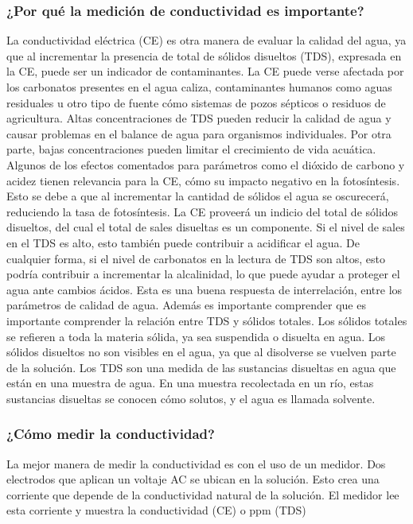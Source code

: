 \subsubsection{¿Por qu\'e la medici\'on de conductividad es importante?}
La conductividad eléctrica (CE) es otra manera de evaluar la calidad del agua, ya que al incrementar la presencia de total de sólidos disueltos (TDS), expresada en la CE, puede ser un indicador de contaminantes. 
La CE puede verse afectada por los carbonatos presentes en el agua caliza, contaminantes humanos como aguas residuales u otro tipo de fuente cómo sistemas de pozos sépticos o residuos de agricultura.
Altas concentraciones de TDS pueden reducir la calidad de agua y causar problemas en el balance de agua para organismos individuales. 
Por otra parte, bajas concentraciones pueden limitar el crecimiento de vida acuática. 
Algunos de los efectos comentados para parámetros como el dióxido de carbono y acidez tienen relevancia para la CE, cómo su impacto negativo en la fotosíntesis. 
Esto se debe a que al incrementar la cantidad de sólidos el agua se oscurecerá, reduciendo la tasa de fotosíntesis. 
La CE proveerá un indicio del total de sólidos disueltos, del cual el total de sales disueltas es un componente. 
Si el nivel de sales en el TDS es alto, esto también puede contribuir a acidificar el agua. 
De cualquier forma, si el nivel de carbonatos en la lectura de TDS son altos, esto podría contribuir a incrementar la alcalinidad, lo que puede ayudar a proteger el agua ante cambios ácidos. 
Esta es una buena respuesta de interrelación, entre los parámetros de calidad de agua.
Adem\'as es importante comprender que es importante comprender la relación entre TDS y sólidos totales. Los sólidos totales se refieren a toda la materia sólida, ya sea suspendida o disuelta en agua. 
Los sólidos disueltos no son visibles en el agua, ya que al disolverse se vuelven parte de la solución. 
Los TDS son una medida de las sustancias disueltas en agua que están en una muestra de agua. 
En una muestra recolectada en un r\'io, estas sustancias disueltas se conocen cómo solutos, y el agua es llamada solvente.

\subsubsection{¿Cómo medir la conductividad?}
La mejor manera de medir la conductividad es con el uso de un medidor. 
Dos electrodos que aplican un voltaje AC se ubican en la solución. 
Esto crea una corriente que depende de la conductividad natural de la solución. 
El medidor lee esta corriente y muestra la conductividad (CE) o ppm (TDS)


